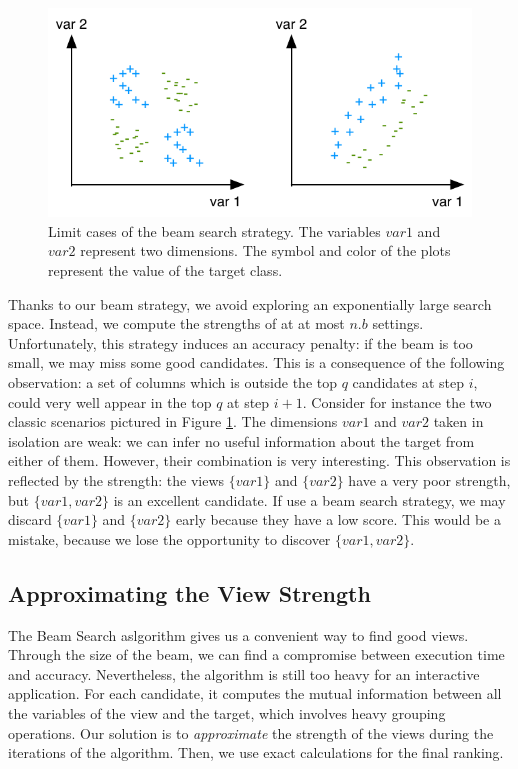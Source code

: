 \begin{figure}[t!]
\centering
\includegraphics[width=0.8\columnwidth]{images/strength-jump}
\caption{Limit cases of the beam search strategy. The variables $var1$ and
$var2$ represent two dimensions. The symbol and color of the plots represent
the value of the target class. }
\label{pic:strength-jump}
\end{figure}
Thanks to our beam strategy, we avoid exploring an exponentially large search
space. Instead, we compute the strengths of at at most $n.b$ settings.
Unfortunately, this strategy induces an accuracy penalty: if the beam is too
small, we may miss some good candidates. This is a consequence of the following
observation: a set of columns which is outside the top $q$ candidates at step
$i$, could very well appear in the top $q$ at step $i+1$. Consider for instance
the two classic scenarios pictured in Figure \ref{pic:strength-jump}. The
dimensions $var1$ and $var2$ taken in isolation are weak: we can infer no
useful information about the target from either of them. However, their
combination is very interesting.  This observation is reflected by the
strength: the views $\{var1\}$ and $\{var2\}$ have a very poor strength, but
$\{var1, var2\}$ is an excellent candidate. If use a beam search strategy, we
may discard  $\{var1\}$ and $\{var2\}$ early because they have a low score.
This would be a mistake, because we lose the opportunity to discover $\{var1,
var2\}$.

\subsection{Approximating the View Strength}
\label{sec:approx}


The Beam Search aslgorithm gives us a convenient way to find good views.
Through the size of the beam, we can find a compromise between execution time
and accuracy.  Nevertheless, the algorithm is still too heavy for an
interactive application. For each candidate, it computes the mutual information
between all the variables of the view and the target, which involves heavy grouping
operations. Our solution is to \emph{approximate} the strength of the views
during the iterations of the algorithm. Then, we use exact calculations for the
final ranking.


